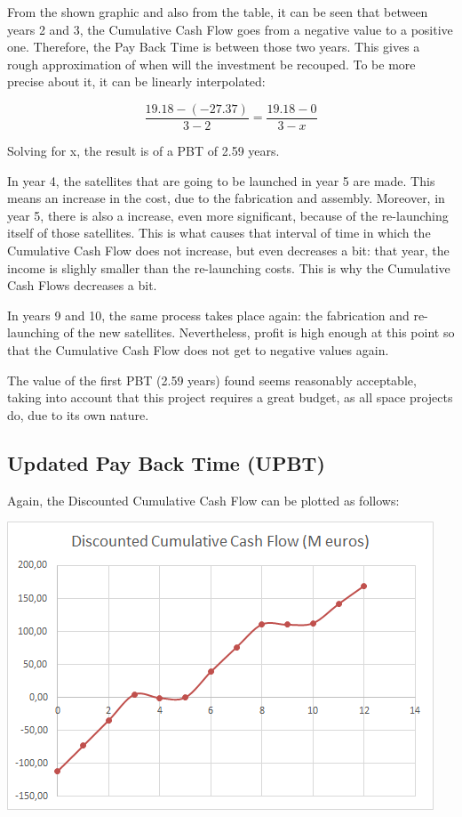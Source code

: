 From the shown graphic and also from the table, it can be seen that between years 2 and 3, the Cumulative Cash Flow goes from a negative value to a positive one. Therefore, the Pay Back Time is between those two years. This gives a rough approximation of when will the investment be recouped. To be more precise about it, it can be linearly interpolated:

\begin{equation}
\frac{19.18-(-27.37)}{3-2}=\frac{19.18-0}{3-x}
\end{equation}

Solving for x, the result is of a PBT of 2.59 years.

In year 4, the satellites that are going to be launched in year 5 are made. This means an increase in the cost, due to the fabrication and assembly. Moreover, in year 5, there is also a increase, even more significant, because of the re-launching itself of those satellites. This is what causes that interval of time in which the Cumulative Cash Flow does not increase, but even decreases a bit: that year, the income is slighly smaller than the re-launching costs. This is why the Cumulative Cash Flows decreases a bit.

In years 9 and 10, the same process takes place again: the fabrication and re-launching of the new satellites. Nevertheless, profit is high enough at this point so that the Cumulative Cash Flow does not get to negative values again. 

The value of the first PBT (2.59 years) found seems reasonably acceptable, taking into account that this project requires a great budget, as all space projects do, due to its own nature. 




\subsection{Updated Pay Back Time (UPBT)}
Again, the Discounted Cumulative Cash Flow can be plotted as follows:

\includegraphics{DCCF.png}

